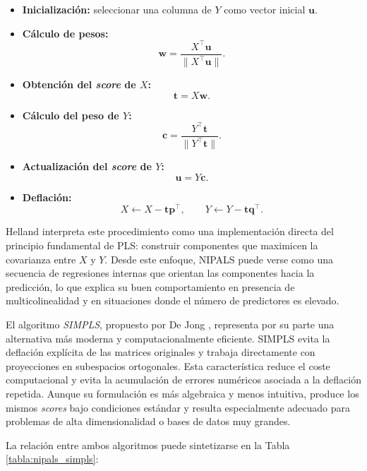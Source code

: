 \documentclass[12pt,a4paper]{report}
\begin{document}
\begin{itemize}
    \item \textbf{Inicialización:} seleccionar una columna de \(Y\) como vector inicial \(\mathbf{u}\).
    \item \textbf{Cálculo de pesos:}
\[
    \mathbf{w} = \frac{X^\top \mathbf{u}}{\|X^\top \mathbf{u}\|}.
    \]

    \item \textbf{Obtención del \textit{score} de \(X\):}
\[
    \mathbf{t} = X\mathbf{w}.
    \]

    \item \textbf{Cálculo del peso de \(Y\):}
\[
    \mathbf{c} = \frac{Y^\top \mathbf{t}}{\|Y^\top \mathbf{t}\|}.
    \]


    \item \textbf{Actualización del \textit{score} de \(Y\):}
\[
    \mathbf{u} = Y\mathbf{c}.
    \]


    \item \textbf{Deflación:}
\[
    X \leftarrow X - \mathbf{t}\mathbf{p}^\top, \qquad 
    Y \leftarrow Y - \mathbf{t}\mathbf{q}^\top.
    \]

\end{itemize}

Helland \cite{helland1988} interpreta este procedimiento como una implementación directa del principio fundamental de PLS: construir componentes que maximicen la covarianza entre \(X\) y \(Y\). Desde este enfoque, NIPALS puede verse como una secuencia de regresiones internas que orientan las componentes hacia la predicción, lo que explica su buen comportamiento en presencia de multicolinealidad y en situaciones donde el número de predictores es elevado.

El algoritmo \textit{SIMPLS}, propuesto por De Jong \cite{dejong1993}, representa por su parte una alternativa más moderna y computacionalmente eficiente. SIMPLS evita la deflación explícita de las matrices originales y trabaja directamente con proyecciones en subespacios ortogonales. Esta característica reduce el coste computacional y evita la acumulación de errores numéricos asociada a la deflación repetida. Aunque su formulación es más algebraica y menos intuitiva, produce los mismos \textit{scores} bajo condiciones estándar y resulta especialmente adecuado para problemas de alta dimensionalidad o bases de datos muy grandes.

La relación entre ambos algoritmos puede sintetizarse en la Tabla \ref{tabla:nipals_simpls}:
\end{document}
